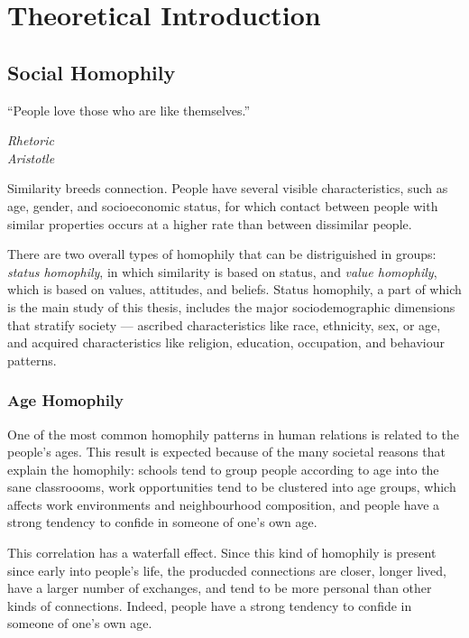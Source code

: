 \section{Theoretical Introduction}

\subsection{Social Homophily}

\epigraph{``People love those who are like themselves.''}{\textit{Rhetoric \\ Aristotle}}

Similarity breeds connection\cite{mcpherson2001birds}. People have several visible characteristics, such as age, gender, and socioeconomic status, for which contact between people with similar properties occurs at a higher rate than between dissimilar people.

There are two overall types of homophily that can be distriguished in groups\cite{lazarsfeld1954}: \textit{status homophily}, in which similarity is based on status, and \textit{value homophily}, which is based on values, attitudes, and beliefs. Status homophily, a part of which is the main study of this thesis, includes the major sociodemographic dimensions that stratify society --- ascribed characteristics like race, ethnicity, sex, or age, and acquired characteristics like religion, education, occupation, and behaviour patterns.

\subsubsection{Age Homophily}

One of the most common homophily patterns in human relations is related to the people's ages\cite{ugander2011}\cite{mcpherson2001birds}. This result is expected because of the many societal reasons that explain the homophily: schools tend to group people according to age into the sane classroooms, work opportunities tend to be clustered into age groups, which affects work environments and neighbourhood composition, and people have a strong tendency to confide in someone of one's own age.

This correlation has a waterfall effect. Since this kind of homophily is present since early into people's life, the producded connections are closer, longer lived, have a larger number of exchanges, and tend to be more personal than other kinds of connections. Indeed, people have a strong tendency to confide in someone of one's own age\cite{mcpherson2001birds}.

